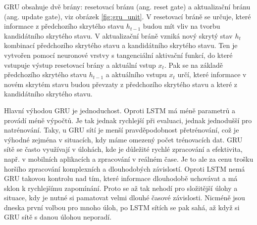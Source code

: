 GRU obsahuje dvě brány: resetovací bránu (ang. reset gate) a aktualizační bránu
(ang. update gate), viz obrázek \ref{fig:gru_unit}. V resetovací bráně se
určuje, které informace z předchozího skrytého stavu $h_{t-1}$ budou mít vliv
na tvorbu kandidátního skrytého stavu. V aktualizační bráně vzniká nový skrytý
stav $h_t$ kombinací předchozího skrytého stavu a kandidátního skrytého stavu.
Ten je vytvořen pomocí neuronové vrstvy s tangenciální aktivační funkcí, do
které vstupuje výstup resetovací brány a aktuální vstup $x_t$. Pak se na
základě předchozího skrytého stavu $h_{t-1}$ a aktuálního vstupu $x_t$ určí,
které informace v novém skrytém stavu budou převzaty z předchozího skrytého
stavu a které z kandidátního skrytého stavu.

Hlavní výhodou GRU je jednoduchost. Oproti LSTM má méně parametrů a provádí
méně výpočtů. Je tak jednak rychlejší při evaluaci, jednak jednodušší pro
natrénování. Taky, u GRU sítí je menší pravděpodobnost přetrénování, což je
výhodné zejména v situacích, kdy máme omezený počet trénovacích dat. GRU sítě
se často využívají v úlohách, kde je důležité rychlé zpracování a efektivita,
např. v mobilních aplikacích a zpracování v reálném čase. Je to ale za cenu
trošku horšího zpracování komplexních a dlouhodobých závislostí. Oproti LSTM
nemá GRU takovou kontrolu nad tím, které informace dlouhodobě uchovávat a má
sklon k rychlejšímu zapomínání. Proto se až tak nehodí pro složitější úlohy a
situace, kdy je nutné si pamatovat velmi dlouhé časové závislosti. Nicméně jsou
dneska první volbou pro mnoho úloh, po LSTM sítích se pak sahá, až když si GRU
sítě s danou úlohou neporadí.


\endinput